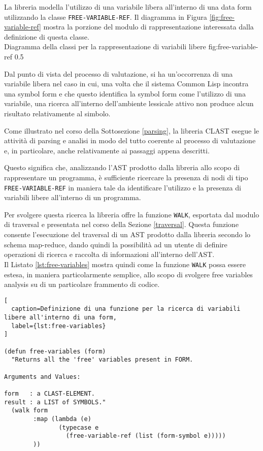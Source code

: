 La libreria modella l'utilizzo di una variabile libera all'interno di una data
form utilizzando la classe \texttt{FREE-VARIABLE-REF}. Il diagramma in Figura
\ref{fig:free-variable-ref} mostra la porzione del modulo di rappresentazione
interessata dalla definizione di questa classe.\\

      {Diagramma della classi per la rappresentazione di variabili libere}
      {fig:free-variable-ref}
      {0.5}

Dal punto di vista del processo di valutazione, si ha un'occorrenza di una
variabile libera nel caso in cui, una volta che il sistema Common Lisp incontra
una symbol form e che questo identifica la symbol form come l'utilizzo di una
variabile, una ricerca all'interno dell'ambiente lessicale attivo non produce
alcun risultato relativamente al simbolo.

Come illustrato nel corso della Sottosezione \ref{parsing}, la libreria CLAST
esegue le attività di parsing e analisi in modo del tutto coerente al processo
di valutazione e, in particolare, anche relativamente ai passaggi appena
descritti.


Questo significa che, analizzando l'AST prodotto dalla libreria allo scopo di
rappresentare un programma, è sufficiente ricercare la presenza di nodi di tipo
\texttt{FREE-VARIABLE-REF} in maniera tale da identificare l'utilizzo e la
presenza di variabili libere all'interno di un programma.

Per svolgere questa ricerca la libreria offre la funzione \texttt{WALK},
esportata dal modulo di traversal e presentata nel corso della Sezione
\ref{traversal}. Questa funzione consente l'esecuzione del traversal di un AST
prodotto dalla libreria secondo lo schema map-reduce, dando quindi la
possibilità ad un utente di definire operazioni di ricerca e raccolta di
informazioni all'interno dell'AST.\\

Il Listato \ref{lst:free-variables} mostra quindi come la funzione \texttt{WALK}
possa essere estesa, in maniera particolarmente semplice, allo scopo di svolgere
free variables analysis su di un particolare frammento di codice.

\begin{lstlisting}[
  caption=Definizione di una funzione per la ricerca di variabili libere all'interno di una form,
  label={lst:free-variables}
]

(defun free-variables (form)
  "Returns all the 'free' variables present in FORM.

Arguments and Values:

form   : a CLAST-ELEMENT.
result : a LIST of SYMBOLS."
  (walk form
        :map (lambda (e)
               (typecase e
                 (free-variable-ref (list (form-symbol e)))))
        ))

\end{lstlisting}

